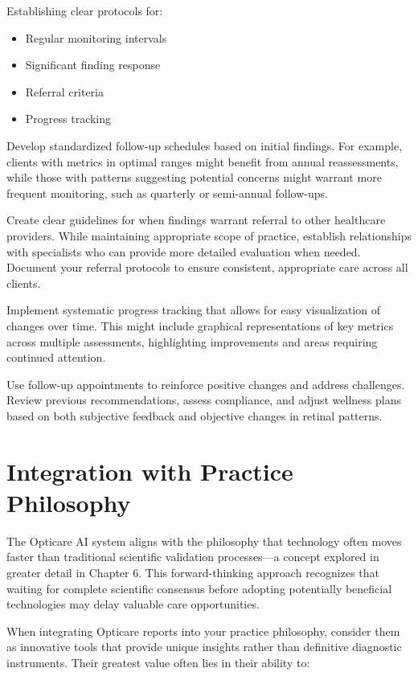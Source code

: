 \documentclass[
  Letterpaper,
]{scrbook}
\providecommand{\tightlist}{%
  \setlength{\itemsep}{0pt}\setlength{\parskip}{0pt}}\usepackage{longtable,booktabs,array}
\begin{document}
Establishing clear protocols for:

\begin{itemize}
\tightlist
\item
  Regular monitoring intervals
\item
  Significant finding response
\item
  Referral criteria
\item
  Progress tracking
\end{itemize}

Develop standardized follow-up schedules based on initial findings. For
example, clients with metrics in optimal ranges might benefit from
annual reassessments, while those with patterns suggesting potential
concerns might warrant more frequent monitoring, such as quarterly or
semi-annual follow-ups.

Create clear guidelines for when findings warrant referral to other
healthcare providers. While maintaining appropriate scope of practice,
establish relationships with specialists who can provide more detailed
evaluation when needed. Document your referral protocols to ensure
consistent, appropriate care across all clients.

Implement systematic progress tracking that allows for easy
visualization of changes over time. This might include graphical
representations of key metrics across multiple assessments, highlighting
improvements and areas requiring continued attention.

Use follow-up appointments to reinforce positive changes and address
challenges. Review previous recommendations, assess compliance, and
adjust wellness plans based on both subjective feedback and objective
changes in retinal patterns.

\section{Integration with Practice
Philosophy}\label{integration-with-practice-philosophy}

The Opticare AI system aligns with the philosophy that technology often
moves faster than traditional scientific validation processes---a
concept explored in greater detail in Chapter 6. This forward-thinking
approach recognizes that waiting for complete scientific consensus
before adopting potentially beneficial technologies may delay valuable
care opportunities.

When integrating Opticare reports into your practice philosophy,
consider them as innovative tools that provide unique insights rather
than definitive diagnostic instruments. Their greatest value often lies
in their ability to:
\end{document}
